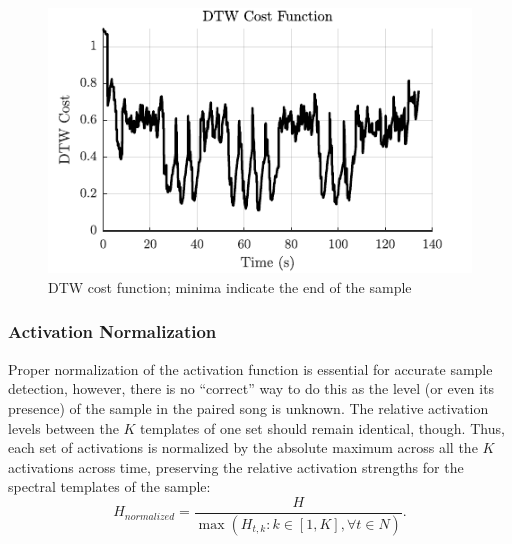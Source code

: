 \documentclass{article}
\begin{document}
\begin{figure}[t]
\centering
\includegraphics[width=\linewidth]{cost.pdf}
\caption{DTW cost function; minima indicate the end of the sample}
\label{fig3}
\end{figure}

\subsubsection{Activation Normalization}
Proper normalization of the activation function is essential for accurate sample detection, however, there is no ``correct'' way to do this as the level (or even its presence) of the sample in the paired song is unknown. The relative activation levels between the $K$ templates of one set should remain identical, though. Thus, each set of activations is normalized by the absolute maximum across all the $K$ activations across time, preserving the relative activation strengths for the spectral templates of the sample:
%
\begin{equation}
H_{normalized} = \frac{H}{\max(H_{t,k}: k\in[1,K], \forall {t} \in N )}.
\end{equation}
%
\end{document}
